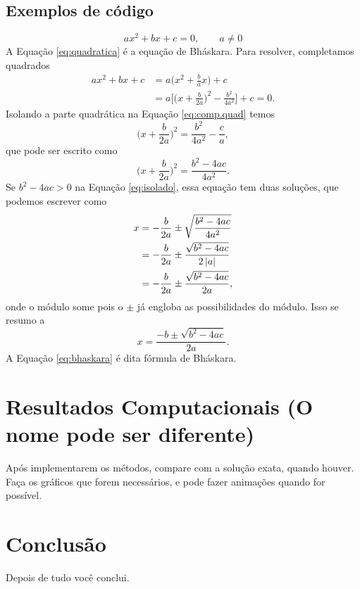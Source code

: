 \documentclass[a4paper,12pt]{article}
\begin{document}
\subsection{Exemplos de código}
\begin{equation}
  ax^2 + bx + c = 0, \qquad a \neq 0 \label{eq:quadratica}
\end{equation}
A Equação \eqref{eq:quadratica} é a equação de Bháskara.
Para resolver, completamos quadrados
\begin{align}
  ax^2 + bx + c & = a\bigg(x^2 + \frac{b}{a}x\bigg) + c \nonumber \\
                & = a\bigg[\bigg(x + \frac{b}{2a}\bigg)^2 -
\frac{b^2}{4a^2}\bigg] + c = 0. \label{eq:comp.quad}
\end{align}
Isolando a parte quadrática na Equação \eqref{eq:comp.quad} temos
\begin{equation*}
  \bigg(x + \frac{b}{2a}\bigg)^2 = \frac{b^2}{4a^2} - \frac{c}{a},
\end{equation*}
que pode ser escrito como
\begin{equation}
  \bigg(x + \frac{b}{2a}\bigg)^2 = \frac{b^2 - 4ac}{4a^2}.
  \label{eq:isolado}
\end{equation}
Se $b^2 - 4ac > 0$ na Equação \eqref{eq:isolado}, essa equação tem duas
soluções, que podemos escrever como
\begin{align*}
  x & = -\frac{b}{2a} \pm \sqrt{\frac{b^2 - 4ac}{4a^2}} \\
    & = -\frac{b}{2a} \pm \frac{\sqrt{b^2 - 4ac}}{2\left\vert {a}\right\vert} \\
    & = -\frac{b}{2a} \pm \frac{\sqrt{b^2 - 4ac}}{2a},
\end{align*}
onde o módulo some pois o $\pm$ já engloba as possibilidades do módulo.
Isso se resumo a
\begin{equation}
  x  = \frac{-b \pm \sqrt{b^2 - 4ac}}{2a}.
  \label{eq:bhaskara}
\end{equation}
A Equação \eqref{eq:bhaskara} é dita fórmula de Bháskara.

\section{Resultados Computacionais (O nome pode ser diferente)}

Após implementarem os métodos, compare com a solução exata, quando houver.
Faça os gráficos que forem necessários, e pode fazer animações quando for
possível.

\section{Conclusão}

Depois de tudo você conclui.

\nocite{otimizacao:nocedal}
\printbibliography
\end{document}
